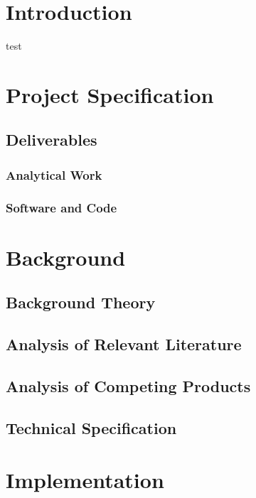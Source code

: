 \documentclass[11pt,oneside]{report}
\begin{document}


\tableofcontents
\newpage

\chapter{Introduction}
test
\cite{10.1145/1497577.1497578}

\chapter{Project Specification}

\section{Deliverables}
\subsection{Analytical Work}
\subsection{Software and Code}



\chapter{Background}

\section{Background Theory}


\section{Analysis of Relevant Literature}


\section{Analysis of Competing Products}

\section{Technical Specification}



\chapter{Implementation}
\end{document}
